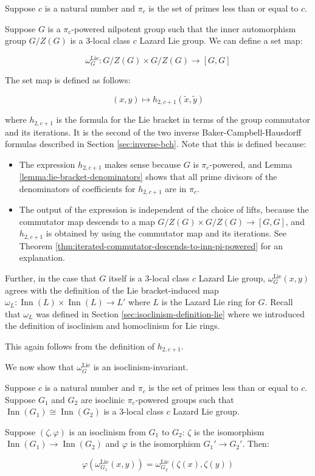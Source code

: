Suppose $c$ is a natural number and $\pi_c$ is the set of primes less
than or equal to $c$. 

Suppose $G$ is a $\pi_c$-powered nilpotent group such that the inner automorphism
group $G/Z(G)$ is a $3$-local class $c$ Lazard Lie group. We can
define a set map:

$$\omega_G^{\text{Lie}}: G/Z(G) \times G/Z(G) \to [G,G]$$

The set map is defined as follows:

$$(x,y) \mapsto h_{2,c+1}(\tilde{x},\tilde{y})$$

where $h_{2,c+1}$ is the formula for the Lie bracket in terms of the
group commutator and its iterations. It is the second of the two
inverse Baker-Campbell-Hausdorff formulas described in Section
\ref{sec:inverse-bch}. Note that this is defined because:

\begin{itemize}
\item The expression $h_{2,c+1}$ makes sense because $G$ is $\pi_c$-powered,
  and Lemma \ref{lemma:lie-bracket-denominators} shows that all prime
  divisors of the denominators of coefficients for $h_{2,c+1}$ are in $\pi_c$.
\item The output of the expression is independent of the choice of
  lifts, because the commutator map descends to a map $G/Z(G) \times
  G/Z(G) \to [G,G]$, and $h_{2,c+1}$ is obtained by using the
  commutator map and its iterations. See Theorem
  \ref{thm:iterated-commutator-descends-to-inn-pi-powered} for an
  explanation.
\end{itemize}

Further, in the case that $G$ itself is a $3$-local class $c$ Lazard
Lie group, $\omega_G^{\text{Lie}}(x,y)$ agrees with the definition of
the Lie bracket-induced map $\omega_L: \operatorname{Inn}(L) \times
\operatorname{Inn}(L) \to L'$ where $L$ is the Lazard Lie ring for
$G$. Recall that $\omega_L$ was defined in Section
\ref{sec:isoclinism-definition-lie} where we introduced the definition
of isoclinism and homoclinism for Lie rings. 

This again follows from the definition of $h_{2,c+1}$. 

We now show that $\omega_G^{\text{Lie}}$ is an isoclinism-invariant.

\begin{lemma}\label{lemma:omega-lie-isoclinism-invariant}
  Suppose $c$ is a natural number and $\pi_c$ is the set of primes less
  than or equal to $c$. Suppose $G_1$ and $G_2$ are isoclinic
  $\pi_c$-powered groups such that $\operatorname{Inn}(G_1) \cong
  \operatorname{Inn}(G_2)$ is a $3$-local class $c$ Lazard Lie group.

  Suppose $(\zeta,\varphi)$ is an isoclinism from $G_1$ to $G_2$:
  $\zeta$ is the isomorphism $\operatorname{Inn}(G_1) \to
  \operatorname{Inn}(G_2)$ and $\varphi$ is the isomorphism $G_1' \to
  G_2'$. Then:

  $$\varphi(\omega^{\text{Lie}}_{G_1}(x,y)) = \omega^{\text{Lie}}_{G_2}(\zeta(x),\zeta(y))$$
\end{lemma}

